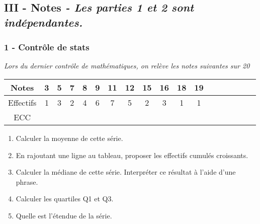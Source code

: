 \documentclass[11pt]{article}
\begin{document}
\subsection*{III - Notes \textit{ - Les parties 1 et 2 sont indépendantes.} }

\subsubsection*{1 - Contrôle de stats}

\textit{Lors du dernier contrôle de mathématiques, on relève les notes suivantes sur 20}

\begin{center}
  \begin{tabular}{| c || c | c | c | c | c | c | c | c | c | c | c | c | c | c | c | c | c | }
    \hline
    Notes     & 3 & 5 & 7 & 8 & 9 & 11 & 12 & 15 & 16 & 18 & 19 \\
    \hline
    Effectifs & 1 & 3 & 2 & 4 & 6 & 7  & 5  & 2  & 3  & 1  & 1  \\
    \hline
    ECC       & \phantom{xxxxxx} & \phantom{xxxxxx} &\phantom{xxxxxx}  & \phantom{xxxxxx} & \phantom{xxxxxx} & \phantom{xxxxxx}  & \phantom{xxxxxx}  & \phantom{xxxxxx}  & \phantom{xxxxxx}  & \phantom{xxxxxx}  & \phantom{xxxxxx}  \\
    \hline
  \end{tabular}
\end{center}
\begin{multicols}{2}
  \begin{enumerate}
  \item[1.] Calculer la moyenne de cette série.
  \item[2.] En rajoutant une ligne au tableau, proposer les effectifs cumulés croissants.
  \item[3.] Calculer la médiane de cette série. Interpréter ce résultat à l'aide d'une phrase.
  \item[4.] Calculer les quartiles Q1 et Q3.
  \item[5.] Quelle est l'étendue de la série.
  \end{enumerate}
\end{multicols}
\end{document}
